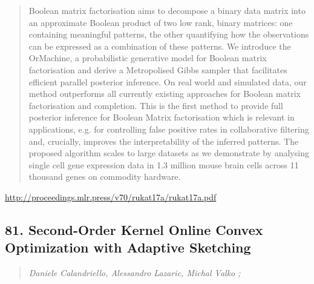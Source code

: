 \documentclass{article}
\begin{document}
\begin{quote}
    Boolean matrix factorisation aims to decompose a binary data matrix into an approximate Boolean product of two low rank, binary matrices: one containing meaningful patterns, the other quantifying how the observations can be expressed as a combination of these patterns. We introduce the OrMachine, a probabilistic generative model for Boolean matrix factorisation and derive a Metropolised Gibbs sampler that facilitates efficient parallel posterior inference. On real world and simulated data, our method outperforms all currently existing approaches for Boolean matrix factorisation and completion. This is the first method to provide full posterior inference for Boolean Matrix factorisation which is relevant in applications, e.g. for controlling false positive rates in collaborative filtering and, crucially, improves the interpretability of the inferred patterns. The proposed algorithm scales to large datasets as we demonstrate by analysing single cell gene expression data in 1.3 million mouse brain cells across 11 thousand genes on commodity hardware.  \end{quote}

\href{http://proceedings.mlr.press/v70/rukat17a/rukat17a.pdf}{http://proceedings.mlr.press/v70/rukat17a/rukat17a.pdf}

\subsection{81. Second-Order Kernel Online Convex Optimization with Adaptive Sketching}

\begin{quote}
\footnotesize{\textit{Daniele Calandriello, Alessandro Lazaric, Michal Valko ;}}
\end{quote}
\end{document}
